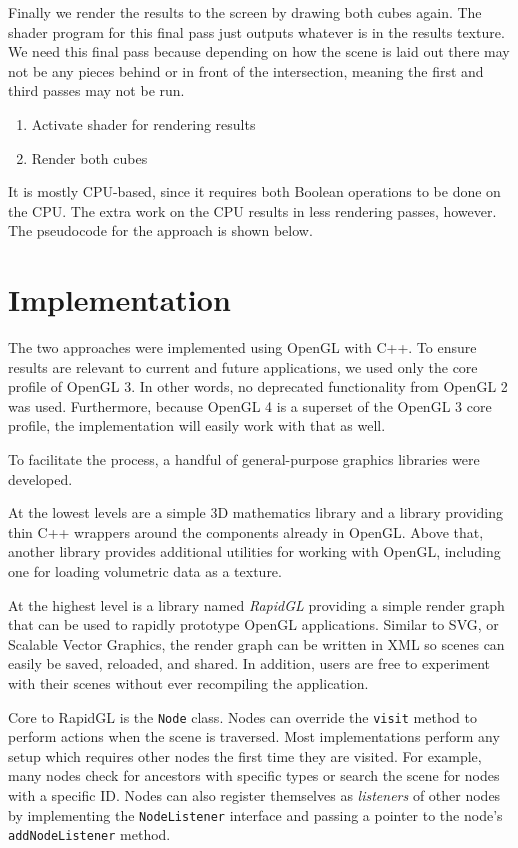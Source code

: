 \documentclass{article}
\begin{document}
Finally we render the results to the screen by drawing both cubes again.  The
shader program for this final pass just outputs whatever is in the results
texture.  We need this final pass because depending on how the scene is laid out
there may not be any pieces behind or in front of the intersection, meaning the
first and third passes may not be run.

\begin{enumerate}
  \item Activate shader for rendering results
  \item Render both cubes
\end{enumerate}

It is mostly CPU-based, since it requires both Boolean operations to be done on
the CPU.  The extra work on the CPU results in less rendering passes, however.
The pseudocode for the approach is shown below.

\section{Implementation}

The two approaches were implemented using OpenGL with C++.  To ensure results
are relevant to current and future applications, we used only the core profile
of OpenGL 3.  In other words, no deprecated functionality from OpenGL 2 was
used.  Furthermore, because OpenGL 4 is a superset of the OpenGL 3 core profile,
the implementation will easily work with that as well.

To facilitate the process, a handful of general-purpose graphics libraries were
developed.

At the lowest levels are a simple 3D mathematics library and a library providing
thin C++ wrappers around the components already in OpenGL.  Above that, another
library provides additional utilities for working with OpenGL, including one for
loading volumetric data as a texture.

At the highest level is a library named {\em RapidGL} providing a simple render
graph that can be used to rapidly prototype OpenGL applications.  Similar to
SVG, or Scalable Vector Graphics, the render graph can be written in XML so
scenes can easily be saved, reloaded, and shared.  In addition, users are free
to experiment with their scenes without ever recompiling the application.

Core to RapidGL is the {\tt Node} class.  Nodes can override the {\tt visit}
method to perform actions when the scene is traversed.  Most implementations
perform any setup which requires other nodes the first time they are visited.
For example, many nodes check for ancestors with specific types or search the
scene for nodes with a specific ID.  Nodes can also register themselves as {\em
listeners} of other nodes by implementing the {\tt NodeListener} interface and
passing a pointer to the node's {\tt addNodeListener} method.
\end{document}
